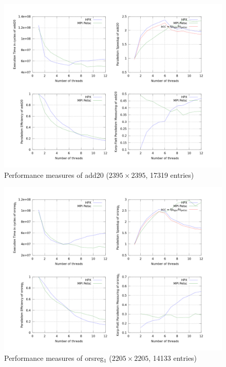 \documentclass[smallextended]{svjour3}
\begin{document}
\begin{figure}[h!]
\begin{center}
\includegraphics[scale=0.25]{Images/add20.jpeg}
\end{center}
\caption{Performance measures of add20 ($2395\times2395$, 17319 entries)}
\label{add20}
\end{figure}

\begin{figure}[h!]
\begin{center}
\includegraphics[scale=0.25]{Images/orsreg1.jpeg}
\end{center}
\caption{Performance measures of orsreg$_1$ ($2205\times2205$, 14133 entries)}
\label{orsreg_1}
\end{figure}
\end{document}
